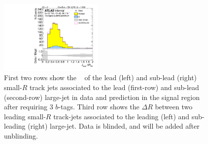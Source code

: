 \begin{figure}[htbp!]
\begin{center}
\includegraphics[width=0.45\textwidth,angle=-90]{figures/boosted/Signal/b77_ThreeTag_Signal_sublHCand_trk_dr_blind.pdf}
  \caption{First two rows show the \pt~ of the lead (left) and sub-lead (right) small-$R$ track jets associated to the lead (first-row) and sub-lead (second-row) large-\R jet in data and prediction in the signal region after requiring 3 $b$-tags. Third row shows the $\Delta R$ between two leading small-$R$ track-jets associated to the leading (left) and sub-leading (right) large-\R jet. Data is blinded, and will be added after unblinding. }
  \label{fig:boosted-3b-signal-blind-ak2}
\end{center}
\end{figure}


